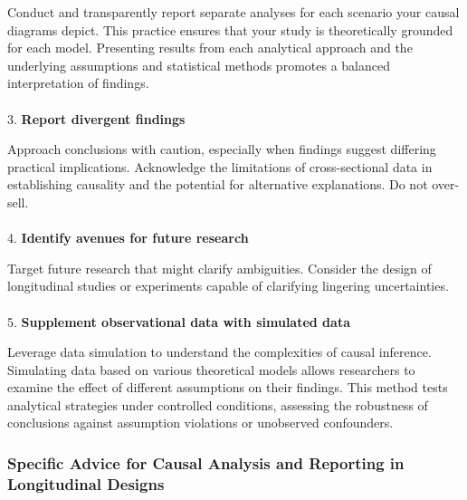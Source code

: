 \documentclass[
  singlecolumn]{article}
\makeatletter
\let\oldparagraph\paragraph
\renewcommand{\paragraph}{
    \@ifstar
      \xxxParagraphStar
      \xxxParagraphNoStar
  }
\newcommand{\xxxParagraphStar}[1]{\oldparagraph*{#1}\mbox{}}
\newcommand{\xxxParagraphNoStar}[1]{\oldparagraph{#1}\mbox{}}
\makeatother
\begin{document}
Conduct and transparently report separate analyses for each scenario
your causal diagrams depict. This practice ensures that your study is
theoretically grounded for each model. Presenting results from each
analytical approach and the underlying assumptions and statistical
methods promotes a balanced interpretation of findings.

\paragraph{\texorpdfstring{3. \textbf{Report divergent
findings}}{3. Report divergent findings}}\label{report-divergent-findings}

Approach conclusions with caution, especially when findings suggest
differing practical implications. Acknowledge the limitations of
cross-sectional data in establishing causality and the potential for
alternative explanations. Do not over-sell.

\paragraph{\texorpdfstring{4. \textbf{Identify avenues for future
research}}{4. Identify avenues for future research}}\label{identify-avenues-for-future-research}

Target future research that might clarify ambiguities. Consider the
design of longitudinal studies or experiments capable of clarifying
lingering uncertainties.

\paragraph{\texorpdfstring{5. \textbf{Supplement observational data with
simulated
data}}{5. Supplement observational data with simulated data}}\label{supplement-observational-data-with-simulated-data}

Leverage data simulation to understand the complexities of causal
inference. Simulating data based on various theoretical models allows
researchers to examine the effect of different assumptions on their
findings. This method tests analytical strategies under controlled
conditions, assessing the robustness of conclusions against assumption
violations or unobserved confounders.

\subsubsection{Specific Advice for Causal Analysis and Reporting in
Longitudinal
Designs}\label{specific-advice-for-causal-analysis-and-reporting-in-longitudinal-designs}
\end{document}

